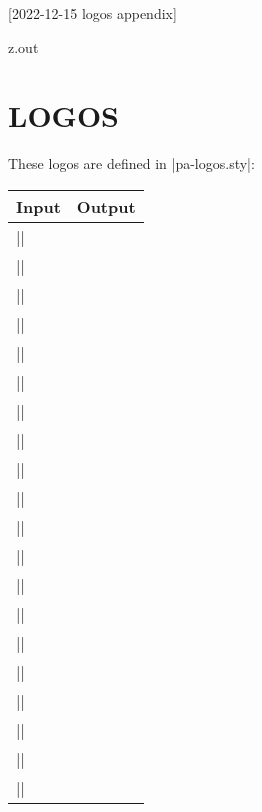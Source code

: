 [2022-12-15 logos appendix]

\begin{VerbatimOut}{z.out}
\chapter{LOGOS}

These logos are defined in |pa-logos.sty|:

\begin{tabular}{@{}ll@{}}
  \toprule
  \bfseries Input& \bfseries Output\\
  \midrule
  |\AMSmathLogo|& \AMSmathLogo\\[2pt]
  |\BibLaTeXLogo|& \BibLaTeXLogo\\[2pt]
  |\BiberLogo|& \BiberLogo\\[2pt]
  |\CalligraphicAMSLaTeXLogo|& \CalligraphicAMSLaTeXLogo\\[2pt]
  |\CircuiTikZLogo|& \CircuiTikZLogo\\[2pt]
  |\CTANLogo|& \CTANLogo\\[2pt]
  |\LaTeXLogo|& \LaTeXLogo\\[2pt]
  |\LuaLaTeXLogo|& \LuaLaTeXLogo\\[2pt]
  |\METAFONTLogo|& \METAFONTLogo\\[2pt]
  |\METAPOSTLogo|& \METAPOSTLogo\\[2pt]
  |\MetaPostLogo|& \MetaPostLogo\\[2pt]
  |\NonCalligraphicAMSLaTeXLogo|& \NonCalligraphicAMSLaTeXLogo\\[2pt]
  |\PurdueThesisLogo|& \PurdueThesisLogo\\[2pt]
  |\PuThLogo|& \PuThLogo\\[2pt]
  |\siunitxLogo|& \siunitxLogo\\[2pt]
  |\TeXLogo|& \TeXLogo\\[2pt]
  |\TeXLiveLogo|& \TeXLiveLogo\\[2pt]
  |\TikZLogo|& \TikZLogo\\[2pt]
  |\TEXUsersGroupLogo|& \TeXUsersGroupLogo\\[2pt]
  |\TUGboatLogo|& \TUGboatLogo\\[2pt]
  \bottomrule
\end{tabular}
\end{VerbatimOut}

\MyIO
